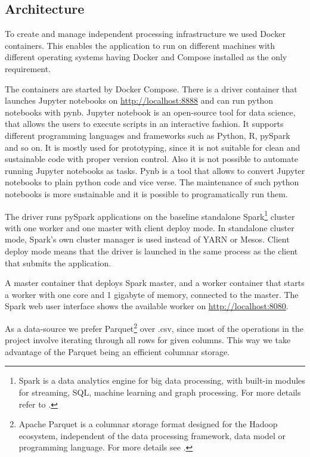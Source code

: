 \subsection{Architecture}
To create and manage independent processing infrastructure we used Docker containers. This enables the application to run on different machines with different operating systems having Docker and Compose installed as the only requirement. 

The containers are started by Docker Compose. There is a driver container that launches Jupyter notebooks on \url{http://localhost:8888} and can run python notebooks with pynb. 
Jupyter notebook is an open-source tool for data science, that allows the users to execute scripts in an interactive fashion. It supports different programming languages and frameworks such as Python, R, pySpark and so on. It is mostly used for prototyping, since it is not suitable for clean and sustainable code with proper version control. Also it is not possible to automate running Jupyter notebooks as tasks. 
Pynb is a tool that allows to convert Jupyter notebooks to plain python code and vice verse. The maintenance of such python notebooks is more sustainable and it is possible to programatically run them. \cite{pynb}

The driver runs pySpark applications on the baseline standalone Spark\footnote{Spark is a data analytics engine for big data processing, with built-in modules for streaming, SQL, machine learning and graph processing. For more details refer to \cite{spark}.} cluster with one worker and one master with client deploy mode. In standalone cluster mode, Spark's own cluster manager is used instead of YARN or Mesos. Client deploy mode means that  the driver is launched in the same process as the client that submits the application. 

A master container that deploys Spark master, and a worker container that starts a worker with one core and 1 gigabyte of memory, connected to the master. The Spark web user interface shows the available worker on \url{http://localhost:8080}.

As a data-source we prefer Parquet\footnote{Apache Parquet is a columnar storage format designed for the Hadoop ecosystem, independent of the data processing framework, data model or programming language. For more details see \cite{parquet}.} over .csv, since most of the operations in the project involve iterating through all rows for given columns. This way we take advantage of the Parquet being an efficient columnar storage.

